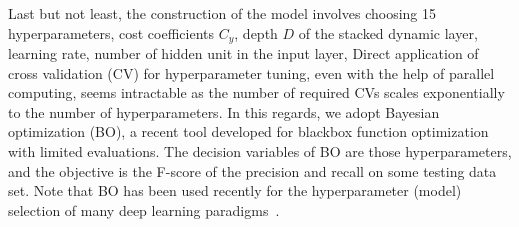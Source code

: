 Last but not least, the construction of the \modelname model involves choosing 15 hyperparameters, \eg cost coefficients $C_{y}$, depth $D$ of the stacked dynamic layer, learning rate, number of hidden unit in the input layer, \etc
Direct application of cross validation (CV) for hyperparameter tuning, even with the help of parallel computing, seems intractable as the number of required CVs scales exponentially to the number of hyperparameters.
In this regards, we adopt Bayesian optimization (BO), a recent tool developed for blackbox function optimization with limited evaluations.
The decision variables of BO are those hyperparameters, and the objective is the F-score of the precision and recall on some testing data set.
Note that BO has been used recently for the hyperparameter (model) selection of many deep learning paradigms~\cite{snoek2012practical}.



